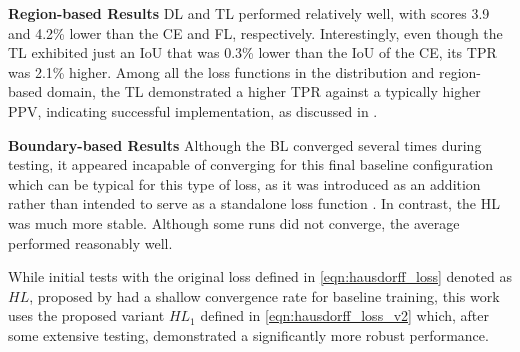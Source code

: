 \textbf{Region-based Results}\newline
\ac{DL} and \ac{TL} performed relatively well, with scores 3.9 and 4.2\% lower than the \ac{CE} and \ac{FL}, respectively. Interestingly, even though the \ac{TL} exhibited just an \ac{IoU} that was 0.3\% lower than the \ac{IoU} of the \ac{CE}, its \ac{TPR} was 2.1\% higher. Among all the loss functions in the distribution and region-based domain, the \ac{TL} demonstrated a higher \ac{TPR} against a typically higher \ac{PPV}, indicating successful implementation, as discussed in .

\textbf{Boundary-based Results}\newline
Although the \acf{BL} converged several times during testing, it appeared incapable of converging for this final baseline configuration which can be typical for this type of loss, as it was introduced as an addition rather than intended to serve as a standalone loss function \cite{Kervadec_2021}. In contrast, the \acf{HL} was much more stable. Although some runs did not converge, the average performed reasonably well. 

While initial tests with the original loss defined in \ref{eqn:hausdorff_loss} denoted as $HL$, proposed by \cite{8767031} had a shallow convergence rate for baseline training, this work uses the proposed variant $HL_1$ defined in \ref{eqn:hausdorff_loss_v2} which, after some extensive testing, demonstrated a significantly more robust performance.

